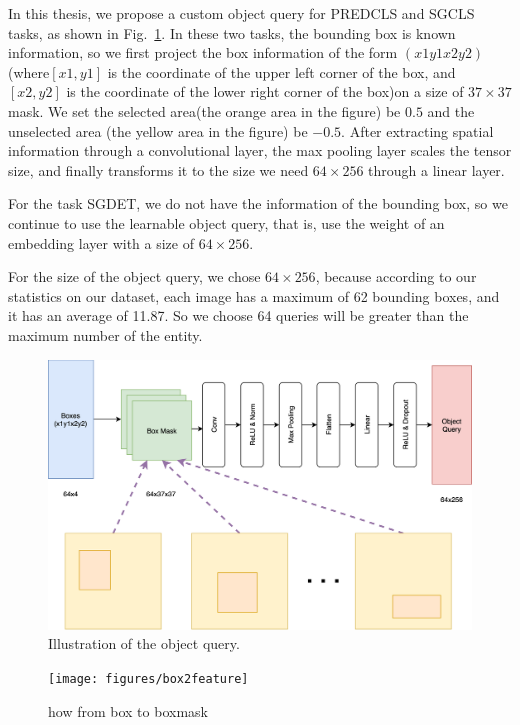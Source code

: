 In this thesis, we propose a custom object query for PREDCLS and SGCLS tasks, as shown in Fig.~\ref{fig:objectquery}. In these two tasks, the bounding box is known information, so we first project the box information of the form $ (x1y1x2y2)  $(where$ [x1,y1] $ is the coordinate of the upper left corner of the box, and $ [x2,y2] $ is the coordinate of the lower right corner of the box)on a size of $ 37 \times 37 $ mask. We set the selected area(the orange area in the figure) be $ 0.5  $ and the unselected area (the yellow area in the figure) be $ -0.5 $. After extracting spatial information through a convolutional layer, the max pooling layer scales the tensor size, and finally transforms it to the size we need $ 64 \times 256 $ through a linear layer.

For the task SGDET, we do not have the information of the bounding box, so we continue to use the learnable object query, that is, use the weight of an embedding layer with a size of $ 64 \times 256 $.

For the size of the object query, we chose $ 64 \times 256 $, because according to our statistics on our dataset, each image has a maximum of 62 bounding boxes, and it has an average of 11.87. So we choose 64 queries will be greater than the maximum number of the entity. 

\begin{figure}[tbph!]
	\centering
	\includegraphics[width=0.8\linewidth]{figures/object_query}
	\caption[Illustration of the object query]{Illustration of the object query.}
	\label{fig:objectquery}
\end{figure}

\begin{figure}
	\centering
	\texttt{[image: figures/box2feature]}
	\caption[box2feature]{how from box to boxmask}
	\label{fig:box2feature}
\end{figure}



